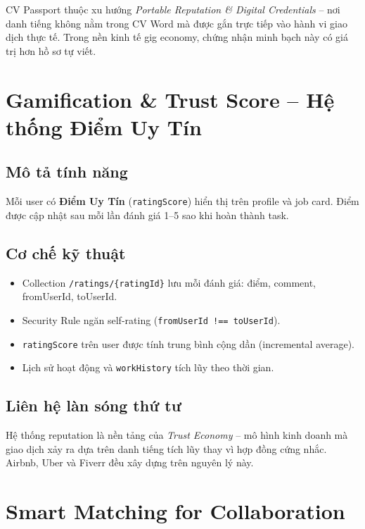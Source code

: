 CV Passport thuộc xu hướng \textit{Portable Reputation \& Digital Credentials} -- nơi
danh tiếng không nằm trong CV Word mà được gắn trực tiếp vào hành vi giao dịch thực tế.
Trong nền kinh tế gig economy, chứng nhận minh bạch này có giá trị hơn hồ sơ tự viết.

\section{Gamification \& Trust Score -- Hệ thống Điểm Uy Tín}

\subsection*{Mô tả tính năng}

Mỗi user có \textbf{Điểm Uy Tín} (\texttt{ratingScore}) hiển thị trên profile và job card.
Điểm được cập nhật sau mỗi lần đánh giá 1--5 sao khi hoàn thành task.

\subsection*{Cơ chế kỹ thuật}

\begin{itemize}
  \item Collection \texttt{/ratings/\{ratingId\}} lưu mỗi đánh giá: điểm, comment,
    fromUserId, toUserId.
  \item Security Rule ngăn self-rating (\texttt{fromUserId !== toUserId}).
  \item \texttt{ratingScore} trên user được tính trung bình cộng dần (incremental average).
  \item Lịch sử hoạt động và \texttt{workHistory} tích lũy theo thời gian.
\end{itemize}

\subsection*{Liên hệ làn sóng thứ tư}

Hệ thống reputation là nền tảng của \textit{Trust Economy} -- mô hình kinh doanh mà giao
dịch xảy ra dựa trên danh tiếng tích lũy thay vì hợp đồng cứng nhắc. Airbnb, Uber và
Fiverr đều xây dựng trên nguyên lý này.

\section{Smart Matching for Collaboration}


